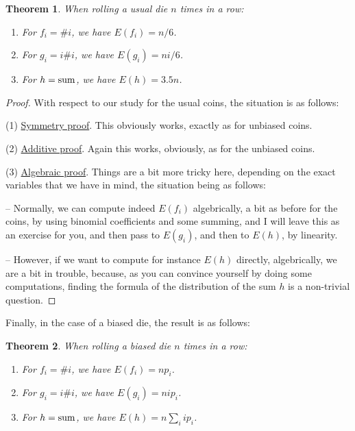 \documentclass[12pt]{amsbook}
\newtheorem{theorem}{Theorem}[chapter]
\begin{document}
\begin{theorem}
When rolling a usual die $n$ times in a row:
\begin{enumerate}
\item For $f_i=\#i$, we have $E(f_i)=n/6$.

\item For $g_i=i\#i$, we have $E(g_i)=ni/6$.

\item For $h={\rm sum}$, we have $E(h)=3.5n$.
\end{enumerate} 
\end{theorem}

\begin{proof}
With respect to our study for the usual coins, the situation is as follows:

\medskip

(1) \underline{Symmetry proof}. This obviously works, exactly as for unbiased coins.

\medskip

(2) \underline{Additive proof}. Again this works, obviously, as for the unbiased coins.

\medskip

(3) \underline{Algebraic proof}. Things are a bit more tricky here, depending on the exact variables that we have in mind, the situation being as follows:

\medskip

-- Normally, we can compute indeed $E(f_i)$ algebrically, a bit as before for the coins, by using binomial coefficients and some summing, and I will leave this as an exercise for you, and then pass to $E(g_i)$, and then to $E(h)$, by linearity.

\medskip

-- However, if we want to compute for instance $E(h)$ directly, algebrically, we are a bit in trouble, because, as you can convince yourself by doing some computations, finding the formula of the distribution of the sum $h$ is a non-trivial question.
\end{proof}

Finally, in the case of a biased die, the result is as follows:


\begin{theorem}
When rolling a biased die $n$ times in a row:
\begin{enumerate}
\item For $f_i=\#i$, we have $E(f_i)=np_i$.

\item For $g_i=i\#i$, we have $E(g_i)=nip_i$.

\item For $h={\rm sum}$, we have $E(h)=n\sum_iip_i$.
\end{enumerate} 
\end{theorem}
\end{document}
